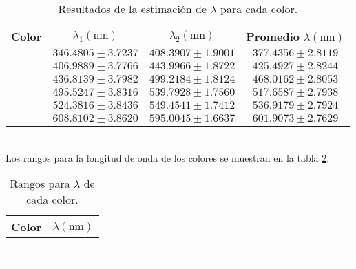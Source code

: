 \documentclass[12pt,a4paper]{article}
\begin{document}
\begin{table}[!htb]
\centering
\caption{Resultados de la estimación de $ \lambda $ para cada color.}
\begin{tabular}{|l|c|c|c|}
	\hline
	Color & $ \lambda_1(\mbox{nm})$ & $ \lambda_2(\mbox{nm})$ & Promedio $ \lambda (\mbox{nm}) $ \\
	\hline
	\rowcolor{violet!25}
	\cellcolor{violet!40}{Violeta}  & $ 346.4805\pm3.7237 $ & $ 408.3907\pm1.9001 $ & $ 377.4356\pm2.8119 $ \\ \hline
	\rowcolor{blue!25}
	\cellcolor{blue!40}{Azul}     & $ 406.9889\pm3.7766 $ & $ 443.9966\pm1.8722 $ & $ 425.4927\pm2.8244 $ \\ \hline
	\rowcolor{green!25}
	\cellcolor{green!40}{Verde}    & $ 436.8139\pm3.7982 $ & $ 499.2184\pm1.8124 $ & $ 468.0162\pm2.8053 $ \\ \hline
	\rowcolor{yellow!25}
	\cellcolor{yellow!40}{Amarillo} & $ 495.5247\pm3.8316 $ & $ 539.7928\pm1.7560 $ & $ 517.6587\pm2.7938 $ \\ \hline
	\rowcolor{orange!25}
	\cellcolor{orange!40}{Anaranjado} & $ 524.3816\pm3.8436 $ & $ 549.4541\pm1.7412 $ & $ 536.9179\pm2.7924 $ \\ \hline
	\rowcolor{red!25}
	\cellcolor{red!40}{Rojo}     & $ 608.8102\pm3.8620 $ & $ 595.0045\pm1.6637 $ & $ 601.9073\pm2.7629 $ \\ \hline
\end{tabular}
\label{tab:4.1}
\end{table}\\
Los rangos para la longitud de onda de los colores se muestran en la tabla \ref{tab:5.1}.
\begin{table}[!htb]
\centering
\caption{Rangos para $ \lambda $ de cada color.}
\begin{tabular}{|l|c|}
	\hline
	Color & $ \lambda(\mbox{nm})$ \\
	\hline
	\cellcolor{violet!40     }{Violeta   } & \cellcolor{violet!25     }{$ 400 - 455 $}  \\ \hline
	\cellcolor{blue!40       }{Azul      } & \cellcolor{blue!25       }{$ 455 - 490 $}  \\ \hline
	\cellcolor{green!40!white}{Verde     } & \cellcolor{green!25!white}{$ 490 - 570 $}  \\ \hline
	\cellcolor{yellow!40     }{Amarillo  } & \cellcolor{yellow!25     }{$ 570 - 590 $}  \\ \hline
	\cellcolor{orange!40     }{Anaranjado} & \cellcolor{orange!25     }{$ 590 - 620 $}  \\ \hline
	\cellcolor{red!40        }{Rojo      } & \cellcolor{red!25        }{$ 620 - 780 $}  \\ \hline
\end{tabular}
\label{tab:5.1}
\end{table}\\
\end{document}
